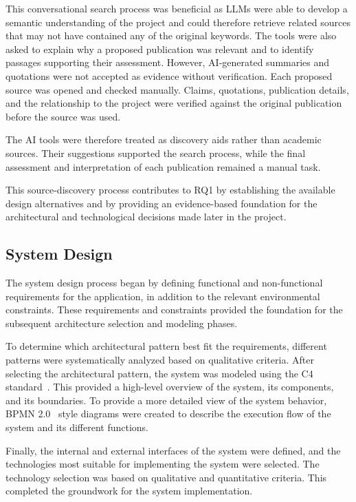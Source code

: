 This conversational search process was beneficial as LLMs were able to develop a semantic understanding of the project and could therefore retrieve related sources that may not have contained any of the original keywords. The tools were also asked to explain why a proposed publication was relevant and to identify passages supporting their assessment. However, AI-generated summaries and quotations were not accepted as evidence without verification. Each proposed source was opened and checked manually. Claims, quotations, publication details, and the relationship to the project were verified against the original publication before the source was used.

The AI tools were therefore treated as discovery aids rather than academic sources. Their
suggestions supported the search process, while the final assessment and interpretation of each publication remained a manual task.

This source-discovery process contributes to RQ1 by establishing the available design alternatives and by providing an evidence-based foundation for the architectural and technological decisions made later in the project.

\subsection{System Design}
The system design process began by defining functional and non-functional requirements for the application, in addition to the relevant environmental constraints. These requirements and constraints provided the foundation for the subsequent architecture selection and modeling phases.

To determine which architectural pattern best fit the requirements, different patterns were systematically analyzed based on qualitative criteria. After selecting the architectural pattern, the system was modeled using the C4 standard~\cite{brown2026c4}. This provided a high-level overview of the system, its components, and its boundaries. To provide a more detailed view of the system behavior, BPMN 2.0~\cite{omg_bpmn_2014} style diagrams were created to describe the execution flow of the system and its different functions.

Finally, the internal and external interfaces of the system were defined, and the technologies most suitable for implementing the system were selected. The technology selection was based on qualitative and quantitative criteria. This completed the groundwork for the system implementation.

